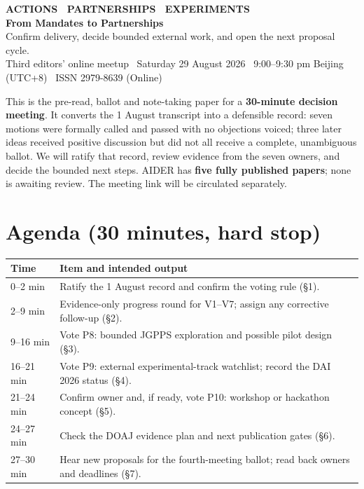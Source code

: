 \documentclass[11pt]{article}
\begin{document}
\begin{tcolorbox}[colback=darkbg,colframe=darkbg,arc=3pt,left=18pt,right=18pt,top=14pt,bottom=14pt]
  {\sffamily\footnotesize\color{accent}\bfseries ACTIONS \textbullet\ PARTNERSHIPS \textbullet\ EXPERIMENTS}\\[4pt]
  {\sffamily\LARGE\bfseries\color{white} From Mandates to Partnerships}\\[5pt]
  {\sffamily\small\color{white!75} Confirm delivery, decide bounded external work, and open the next proposal cycle.}\\[8pt]
  {\sffamily\footnotesize\color{white!60} Third editors' online meetup \textbullet\ Saturday 29 August 2026 \textbullet\ 9:00--9:30 pm Beijing (UTC+8) \textbullet\ ISSN 2979-8639 (Online)}
\end{tcolorbox}

\vspace{4pt}
{\small\color{ink2}This is the pre-read, ballot and note-taking paper for a \textbf{30-minute decision meeting}. It converts the 1 August transcript into a defensible record: seven motions were formally called and passed with no objections voiced; three later ideas received positive discussion but did not all receive a complete, unambiguous ballot. We will ratify that record, review evidence from the seven owners, and decide the bounded next steps. AIDER has \textbf{five fully published papers}; none is awaiting review. The meeting link will be circulated separately.}

\section*{Agenda \textnormal{\footnotesize\color{ink3}(30 minutes, hard stop)}}
\renewcommand{\arraystretch}{1.14}
\begin{center}\small
\begin{tabular}{@{}p{1.55cm}p{12.55cm}@{}}
\toprule
\textbf{Time} & \textbf{Item and intended output} \\
\midrule
0--2 min & Ratify the 1 August record and confirm the voting rule (\S1). \\
2--9 min & Evidence-only progress round for V1--V7; assign any corrective follow-up (\S2). \\
9--16 min & Vote P8: bounded JGPPS exploration and possible pilot design (\S3). \\
16--21 min & Vote P9: external experimental-track watchlist; record the DAI 2026 status (\S4). \\
21--24 min & Confirm owner and, if ready, vote P10: workshop or hackathon concept (\S5). \\
24--27 min & Check the DOAJ evidence plan and next publication gates (\S6). \\
27--30 min & Hear new proposals for the fourth-meeting ballot; read back owners and deadlines (\S7). \\
\bottomrule
\end{tabular}
\end{center}
\end{document}
